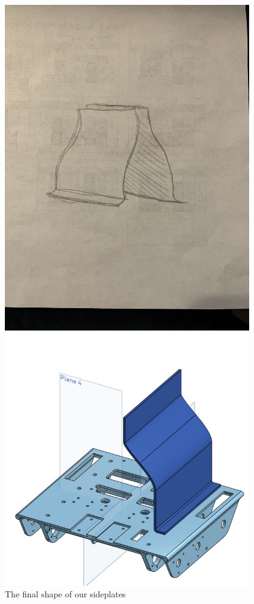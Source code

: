 \begin{figure}[ht]
\centering
\begin{minipage}[b]{.48\textwidth}
  \centering
  \includegraphics[width=0.95\textwidth]{Meetings/November/11-26-21/11-26-21_CAD_Figure3 - Nathan Forrer.JPG}
  \caption{The final shape of our sideplates}
  \label{fig:112621_3}
\end{minipage}%
\hfill%
\begin{minipage}[b]{.48\textwidth}
  \centering
  \includegraphics[width=0.95\textwidth]{Meetings/November/11-26-21/11-26-21_CAD_Figure4 - Nathan Forrer.JPG}

\end{minipage}
\end{figure}
